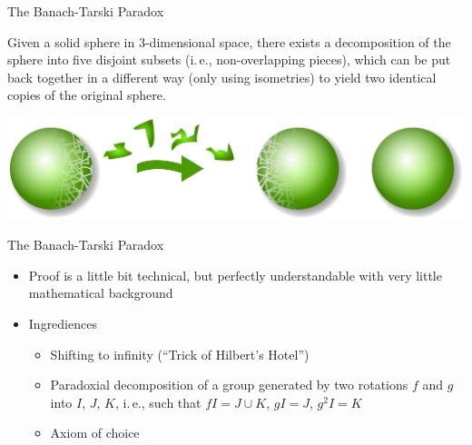 \documentclass[compress]{beamer}
\begin{document}
\begin{frame}{The Banach-Tarski Paradox}
  \pause
  \begin{theorem}
    Given a solid sphere in 3-dimensional space, there exists a decomposition of
    the sphere into five disjoint subsets (i.\,e., non-overlapping pieces),
    which can be put back together in a different way (only using isometries) to
    yield two identical copies of the original sphere.
  \end{theorem}
  \pause
  \includegraphics[width=\linewidth]{Banach-Tarski_Paradox-Illustration.png}
\end{frame}

\begin{frame}{The Banach-Tarski Paradox}
  \begin{itemize}
  \item Proof is a little bit technical, but perfectly understandable with very
    little mathematical background 
  \item Ingrediences
    \begin{itemize}
    \item Shifting to infinity (``Trick of Hilbert's Hotel'')
    \item Paradoxial decomposition of a group generated by two rotations $f$ and $g$ into $I$, $J$, $K$, i.\,e., such that $fI = J \cup K$, $gI = J$, $g^2I = K$
    \item Axiom of choice
    \end{itemize}
  \end{itemize}
\end{frame}
\end{document}
